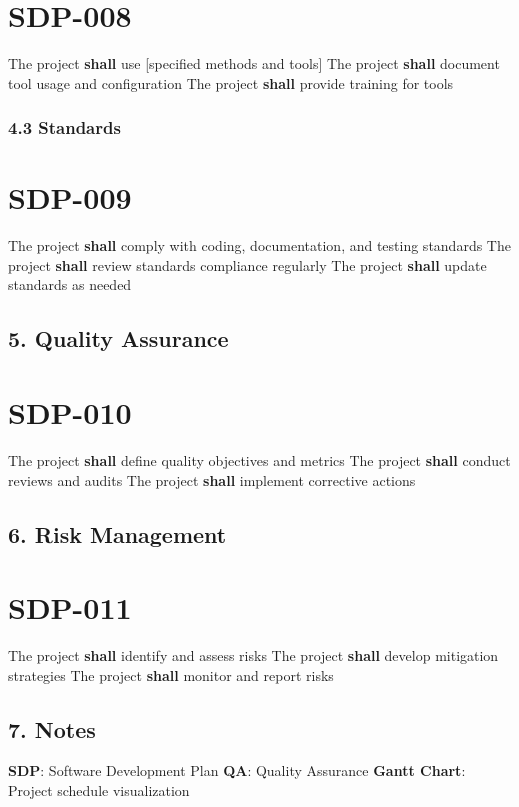 \section{SDP-008}\label{SDP-008}

The project \textbf{shall} use [specified methods and tools]
The project \textbf{shall} document tool usage and configuration
The project \textbf{shall} provide training for tools

\subsubsection{4.3 Standards}

\section{SDP-009}\label{SDP-009}

The project \textbf{shall} comply with coding, documentation, and testing standards
The project \textbf{shall} review standards compliance regularly
The project \textbf{shall} update standards as needed

\subsection{5. Quality Assurance}

\section{SDP-010}\label{SDP-010}

The project \textbf{shall} define quality objectives and metrics
The project \textbf{shall} conduct reviews and audits
The project \textbf{shall} implement corrective actions

\subsection{6. Risk Management}

\section{SDP-011}\label{SDP-011}

The project \textbf{shall} identify and assess risks
The project \textbf{shall} develop mitigation strategies
The project \textbf{shall} monitor and report risks

\subsection{7. Notes}
\textbf{SDP}: Software Development Plan
\textbf{QA}: Quality Assurance
\textbf{Gantt Chart}: Project schedule visualization


